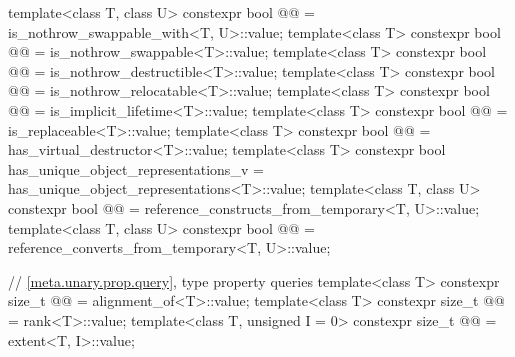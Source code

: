 \begin{codeblock}
{  template<class T, class U>
    constexpr bool @@ = is_nothrow_swappable_with<T, U>::value;
  template<class T>
    constexpr bool @@ = is_nothrow_swappable<T>::value;
  template<class T>
    constexpr bool @@ = is_nothrow_destructible<T>::value;
  template<class T>
    constexpr bool @@ = is_nothrow_relocatable<T>::value;
  template<class T>
    constexpr bool @@ = is_implicit_lifetime<T>::value;
  template<class T>
    constexpr bool @@ = is_replaceable<T>::value;
  template<class T>
    constexpr bool @@ = has_virtual_destructor<T>::value;
  template<class T>
    constexpr bool has_unique_object_representations_v
      = has_unique_object_representations<T>::value;
  template<class T, class U>
    constexpr bool @@
      = reference_constructs_from_temporary<T, U>::value;
  template<class T, class U>
    constexpr bool @@
      = reference_converts_from_temporary<T, U>::value;

  // \ref{meta.unary.prop.query}, type property queries
  template<class T>
    constexpr size_t @@ = alignment_of<T>::value;
  template<class T>
    constexpr size_t @@ = rank<T>::value;
  template<class T, unsigned I = 0>
    constexpr size_t @@ = extent<T, I>::value;

}
\end{codeblock}
